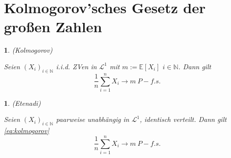 \documentclass[10pt,a4paper]{report}
\numberwithin{equation}{section}
\numberwithin{figure}{section}
\theoremstyle{plain}
\theoremstyle{definition}
\theoremstyle{plain}
\newtheorem{prop}[thm]{\protect\propositionname}
\theoremstyle{definition}
\theoremstyle{remark}
\theoremstyle{plain}
\theoremstyle{plain}
\theoremstyle{plain}
\providecommand{\propositionname}{Satz}
\newcommand{\1}{ \mathbb{1} } %
\begin{document}
\section{Kolmogorov'sches Gesetz der großen Zahlen}
\begin{prop}
(Kolmogorov)

Seien $\left(X_{i}\right)_{i\in\mathbb{N}}$ i.i.d. ZVen in $\mathcal{L}^{1}$
mit $m:=\mathbb{E}\left[X_{i}\right]$ $i\in\mathbb{N}$. Dann gilt
\begin{equation}
\frac{1}{n}\sum_{i=1}^{n}X_{i}\to m\ P-f.s.\label{eq:kolmogorov}
\end{equation}

\end{prop}

\begin{prop}
(Etenadi)

Seien $\left(X_{i}\right)_{i\in\mathbb{N}}$ \emph{paarweise }unabhängig
in $\mathcal{L}^{1}$, identisch verteilt. Dann gilt \ref{eq:kolmogorov}
\[
\frac{1}{n}\sum_{i=1}^{n}X_{i}\to m\ P-f.s.
\]
\end{prop}
\end{document}
